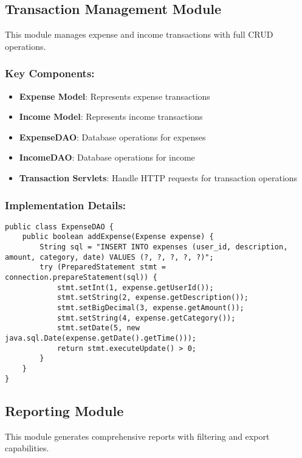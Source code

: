 \subsection{Transaction Management Module}

This module manages expense and income transactions with full CRUD operations.

\subsubsection{Key Components:}
\begin{itemize}
    \item \textbf{Expense Model}: Represents expense transactions
    \item \textbf{Income Model}: Represents income transactions
    \item \textbf{ExpenseDAO}: Database operations for expenses
    \item \textbf{IncomeDAO}: Database operations for income
    \item \textbf{Transaction Servlets}: Handle HTTP requests for transaction operations
\end{itemize}

\subsubsection{Implementation Details:}
\begin{lstlisting}[caption=Transaction Management Implementation]
public class ExpenseDAO {
    public boolean addExpense(Expense expense) {
        String sql = "INSERT INTO expenses (user_id, description, amount, category, date) VALUES (?, ?, ?, ?, ?)";
        try (PreparedStatement stmt = connection.prepareStatement(sql)) {
            stmt.setInt(1, expense.getUserId());
            stmt.setString(2, expense.getDescription());
            stmt.setBigDecimal(3, expense.getAmount());
            stmt.setString(4, expense.getCategory());
            stmt.setDate(5, new java.sql.Date(expense.getDate().getTime()));
            return stmt.executeUpdate() > 0;
        }
    }
}
\end{lstlisting}

\subsection{Reporting Module}

This module generates comprehensive reports with filtering and export capabilities.

